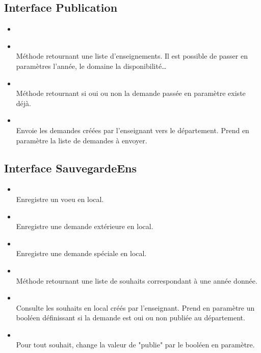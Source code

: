 	\subsection{Interface Publication}
	
	    \begin{itemize}
        	\item {}
        	\item {}\\
        	Méthode retournant une liste d'enseignements. Il est possible de passer en paramètres l'année, le domaine la disponibilité\dots
        	
        	\item {}\\
        	Méthode retournant si oui ou non la demande passée en paramètre existe déjà.
        	
        	\item {}\\
    	    Envoie les demandes créées par l'enseignant vers le département. Prend en paramètre la liste de demandes à envoyer.
    	\end{itemize}
	
	\subsection{Interface SauvegardeEns}
	    \begin{itemize}
	        
	        \item {}\\
	        Enregistre un voeu en local.
	        
	        \item {}\\
	        Enregistre une demande extérieure en local.
	        
	        \item {}\\
	        Enregistre une demande spéciale en local.
	        
	        \item {}\\
	        Méthode retournant une liste de souhaits correspondant à une année donnée.
	        
	        \item {}\\
	        Consulte les souhaits en local créés par l'enseignant. Prend en paramètre un booléen définissant si la demande est oui ou non publiée au département. 
	        
	        \item {}\\
	        Pour tout souhait, change la valeur de "publie" par le booléen en paramètre.
	        
	    \end{itemize}
		
